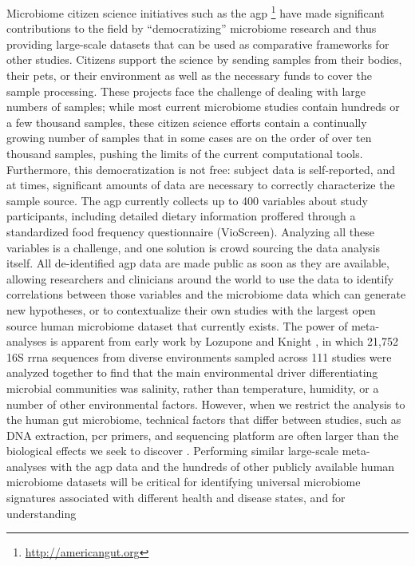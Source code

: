 Microbiome citizen science initiatives such as the \gls{agp}
\footnote{\label{agpurl}\url{http://americangut.org}} have made significant
contributions to the field by “democratizing” microbiome research and thus
providing large-scale datasets that can be used as comparative frameworks for
other studies. Citizens support the science by sending samples from their bodies,
their pets, or their environment as well as the necessary funds to cover the sample
processing. These projects face the challenge of dealing with large numbers of
samples; while most current microbiome studies contain hundreds or a few thousand
samples, these citizen science efforts contain a continually growing number of
samples that in some cases are on the order of over ten thousand samples, pushing
the limits of the current computational tools. Furthermore, this democratization
is not free: subject data is self-reported, and at times, significant amounts of
data are necessary to correctly characterize the sample source. The \gls{agp}
currently collects up to 400 variables about study participants, including detailed
dietary information proffered through a standardized food frequency questionnaire
(VioScreen). Analyzing all these variables is a challenge, and one solution is crowd
sourcing the data analysis itself. All de-identified \gls{agp} data are made public
as soon as they are available, allowing researchers and clinicians around the world
to use the data to identify correlations between those variables and the microbiome
data which can generate new hypotheses, or to contextualize their own studies with
the largest open source human microbiome dataset that currently exists. The power
of meta-analyses is apparent from early work by Lozupone and Knight \cite{Lozupone2007},
in which 21,752 16S \gls{rrna} sequences from diverse environments sampled across 111
studies were analyzed together to find that the main environmental driver differentiating
microbial communities was salinity, rather than temperature, humidity, or a number of
other environmental factors. However, when we restrict the analysis to the human gut
microbiome, technical factors that differ between studies, such as DNA extraction,
\gls{pcr} primers, and sequencing platform are often larger than the biological
effects we seek to discover \cite{Lozupone2013}. Performing similar large-scale
meta-analyses with the \gls{agp} data and the hundreds of other publicly available
human microbiome datasets will be critical for identifying universal microbiome
signatures associated with different health and disease states, and for understanding
